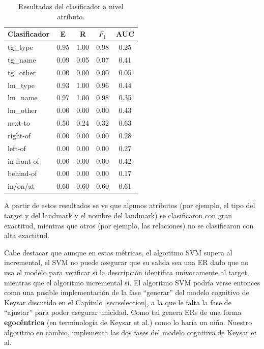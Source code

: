 \begin{table}[h]
\begin{center}
\footnotesize{

\begin{tabular}{l c c c c }
\hline
{{Clasificador}}	& {E} & {R} & {$F_{1}$} & {AUC} \\
\hline
{{tg\_type}} 			& 0.95 & 1.00 & 0.98 & 0.25 \\
{{tg\_name}}			& 0.09 & 0.05 & 0.07 & 0.41 \\
{{tg\_other}}			& 0.00 & 0.00 & 0.00 & 0.05 \\                               
{{lm\_type}}			& 0.93 & 1.00 & 0.96 & 0.44 \\                               
{{lm\_name}}			& 0.97 & 1.00 & 0.98 & 0.35 \\                               
{{lm\_other}}			& 0.00 & 0.00 & 0.00 & 0.43 \\                               
{{next-to}}				& 0.50 & 0.24 & 0.32 & 0.63 \\                               
{{right-of}}			& 0.00 & 0.00 & 0.00 & 0.28 \\                               
{{left-of}}				& 0.00 & 0.00 & 0.00 & 0.27 \\                               
{{in-front-of}}		& 0.00 & 0.00 & 0.00 & 0.42 \\                               
{{behind-of}}			& 0.00 & 0.00 & 0.00 & 0.17 \\                               
{{in/on/at}} 			& 0.60 & 0.60 & 0.60 & 0.61 \\                               
\hline                   
\end{tabular}
\caption{Resultados del clasificador a nivel atributo.}
\label{tab-svm-results}
}
\end{center}
\end{table}
\normalsize

A partir de estos resultados se ve que algunos atributos (por ejemplo, el tipo del target y del landmark y el nombre del landmark) se clasificaron con gran exactitud, mientras que otros (por ejemplo, las relaciones) no se clasificaron con alta exactitud.

Cabe destacar que aunque en estas m\'etricas, el algoritmo SVM supera al incremental, el SVM no puede asegurar que su salida sea una ER dado que no usa el modelo para verificar si la descripci\'on identifica un\'ivocamente al target, mientras que el algoritmo incremental s\'i. El algoritmo SVM podr\'ia verse entonces como una posible implementaci\'on de la fase ``generar'' del modelo cognitivo de Keysar \cite{keysar:Curr98} discutido en el Cap\'itulo \ref{sec:seleccion}, a la que le falta la fase de ``ajustar'' para poder asegurar unicidad. Como tal genera ERs de una forma \textbf{egoc\'entrica} (en terminolog\'ia de Keysar et al.) como lo har\'ia un ni\~no. Nuestro algoritmo en cambio, implementa las dos fases del modelo cognitivo de Keysar et al.

